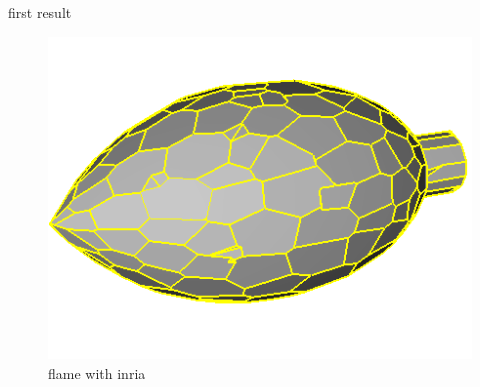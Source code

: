 \documentclass[10pt]{beamer}
\begin{document}
\begin{frame}{first result}
\begin{figure}[H]
\begin{minipage}[t]{0.29\textwidth}
        \includegraphics[width=\textwidth]{../../images/screen_kinetic/flame_inria.png}
        \caption*{flame with inria}
      \end{minipage}
\end{figure}
\end{frame}
\end{document}
